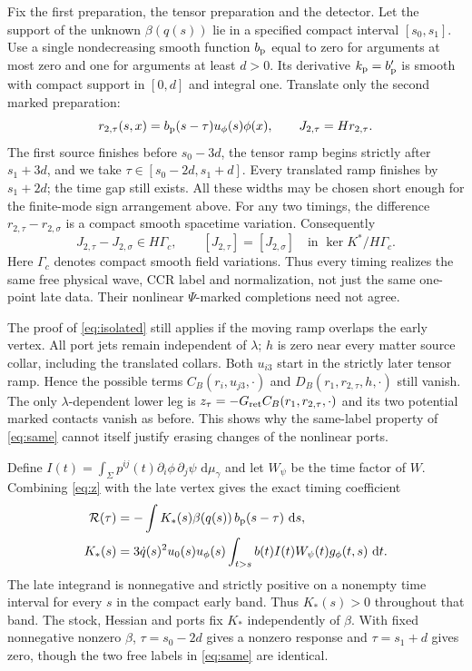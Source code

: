\documentclass[11pt]{article}
\newcommand{\dd}{\,\mathrm d}
\newcommand{\Rret}{G_{\rm ret}}
\numberwithin{equation}{section}
\begin{document}
Fix the first preparation, the tensor preparation and the detector. Let the support of the unknown $\beta(q(s))$ lie in a specified compact interval $[s_0,s_1]$. Use a single nondecreasing smooth function $b_{\rm p}$ equal to zero for arguments at most zero and one for arguments at least $d>0$. Its derivative $k_{\rm p}=b_{\rm p}'$ is smooth with compact support in $[0,d]$ and integral one. Translate only the second marked preparation:
\begin{equation}
 r_{2,\tau}(s,x)=b_{\rm p}(s-\tau)u_\phi(s)\phi(x),\qquad
 J_{2,\tau}=Hr_{2,\tau}.
 \label{eq:timing}
\end{equation}
The first source finishes before $s_0-3d$, the tensor ramp begins strictly after $s_1+3d$, and we take $\tau\in[s_0-2d,s_1+d]$. Every translated ramp finishes by $s_1+2d$; the time gap still exists. All these widths may be chosen short enough for the finite-mode sign arrangement above. For any two timings, the difference $r_{2,\tau}-r_{2,\sigma}$ is a compact smooth spacetime variation. Consequently
\begin{equation}
 J_{2,\tau}-J_{2,\sigma}\in H\Gamma_c,\qquad
              [J_{2,\tau}]=[J_{2,\sigma}]\quad
                   \text{in }\ker K^*/H\Gamma_c .
 \label{eq:same}
\end{equation}
Here $\Gamma_c$ denotes compact smooth field variations. Thus every timing realizes the same free physical wave, CCR label and normalization, not just the same one-point late data. Their nonlinear $\Psi$-marked completions need not agree.

The proof of \eqref{eq:isolated} still applies if the moving ramp overlaps the early vertex. All port jets remain independent of $\lambda$; $h$ is zero near every matter source collar, including the translated collars. Both $u_{i3}$ start in the strictly later tensor ramp. Hence the possible terms $C_B(r_i,u_{j3},\cdot)$ and $D_B(r_1,r_{2,\tau},h,\cdot)$ still vanish. The only $\lambda$-dependent lower leg is $z_\tau=-\Rret C_B(r_1,r_{2,\tau},\cdot)$ and its two potential marked contacts vanish as before. This shows why the same-label property of \eqref{eq:same} cannot itself justify erasing changes of the nonlinear ports.

Define $I(t)=\int_\Sigma p^{ij}(t)\partial_i\phi\,\partial_j\psi\,\dd\mu_\gamma$ and let $W_\psi$ be the time factor of $W$. Combining \eqref{eq:z} with the late vertex gives the exact timing coefficient
\begin{align}
 \mathcal R(\tau)&=-\int K_*(s)\beta(q(s))\,b_{\rm p}(s-\tau)\,\dd s,\label{eq:scan}\\
 K_*(s)&=3\dot q(s)^2u_0(s)u_\phi(s)
       \int_{t>s}b(t)I(t)W_\psi(t)g_\phi(t,s)\,\dd t .
 \label{eq:weight}
\end{align}
The late integrand is nonnegative and strictly positive on a nonempty time interval for every $s$ in the compact early band. Thus $K_*(s)>0$ throughout that band. The stock, Hessian and ports fix $K_*$ independently of $\beta$. With fixed nonnegative nonzero $\beta$, $\tau=s_0-2d$ gives a nonzero response and $\tau=s_1+d$ gives zero, though the two free labels in \eqref{eq:same} are identical.
\end{document}
